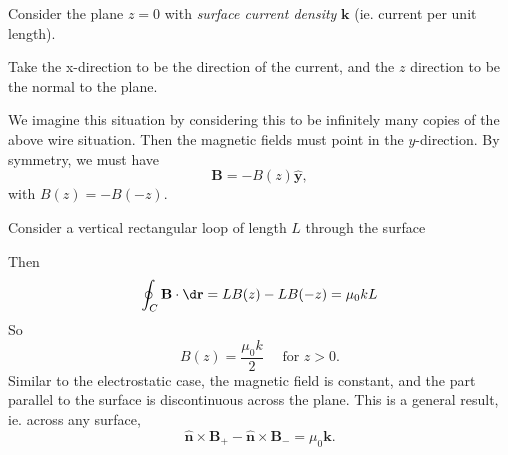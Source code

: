 \documentclass[a4paper]{article}
\begin{document}
\begin{eg}
  Consider the plane $z = 0$ with \emph{surface current density} $\mathbf{k}$ (ie. current per unit length).
  \begin{center}
  \end{center}
  Take the x-direction to be the direction of the current, and the $z$ direction to be the normal to the plane.

  We imagine this situation by considering this to be infinitely many copies of the above wire situation. Then the magnetic fields must point in the $y$-direction. By symmetry, we must have
  \[
    \mathbf{B} = -B(z) \hat{\mathbf{y}},
  \]
  with $B(z) = -B(-z)$.

  Consider a vertical rectangular loop of length $L$ through the surface
  \begin{center}
  \end{center}
  Then
  \[
    \oint_C \mathbf{B}\cdot \d \mathbf{r} = LB(z) - LB(-z) = \mu_0 kL
  \]
  So
  \[
    B(z) = \frac{\mu_0 k}{2}\quad\text{ for }z > 0.
  \]
  Similar to the electrostatic case, the magnetic field is constant, and the part parallel to the surface is discontinuous across the plane. This is a general result, ie. across any surface,
  \[
    \hat {\mathbf{n}} \times \mathbf{B}_+ - \hat{\mathbf{n}}\times \mathbf{B}_{-} = \mu_0 \mathbf{k}.
  \]
\end{eg}
\end{document}
